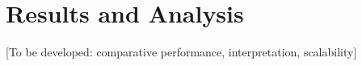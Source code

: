 \chapter{Results and Analysis}
\label{chap:results}

[To be developed: comparative performance, interpretation, scalability]